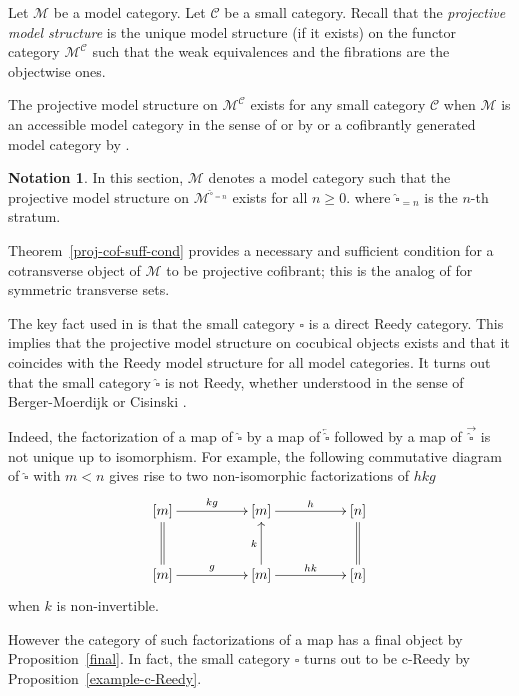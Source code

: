 \documentclass[a4paper,12pt]{amsart}
\makeatletter
\newcommand{\C}{\mathcal{C}}
\renewcommand{\vec}{\overrightarrow}
\theoremstyle{definition}
\newtheorem{nota}[thm]{Notation}
\newcommand{\fr}[1]{\ar@{->}[r]^-{#1}}
\newcommand{\fu}[1]{\ar@{->}[u]^-{#1}}
\renewcommand{\geq}{\geqslant}
\makeatother
\begin{document}
Let $\mathcal{M}$ be a model category. Let $\C$ be a small category. Recall that the \textit{projective model structure} is the unique model structure (if it exists) on the functor category $\mathcal{M}^\C$ such that the weak equivalences and the fibrations are the objectwise ones. 

The projective model structure on $\mathcal{M}^\C$ exists for any small category $\C$ when $\mathcal{M}$ is an accessible model category in the sense of \cite[Definition~5.1]{zbMATH06722019} or \cite[Definition~3.1.6]{HKRS17} by \cite[Theorem~3.4.1]{HKRS17} or a cofibrantly generated model category by \cite[Theorem~11.6.1]{ref_model2}.

\begin{nota}
	In this section, $\mathcal{M}$ denotes a model category such that the projective model structure on $\mathcal{M}^{\widehat{\square}_{=n}}$ exists for all $n\geq 0$. where $\widehat{\square}_{=n}$ is the $n$-th stratum.
\end{nota} 


Theorem~\ref{proj-cof-suff-cond} provides a necessary and sufficient condition for a cotransverse object of $\mathcal{M}$ to be projective cofibrant; this is the analog of \cite[Proposition~2.3.1]{realization} for symmetric transverse sets. 

The key fact used in \cite{realization} is that the small category $\square$ is a direct Reedy category. This implies that the projective model structure on cocubical objects exists and that it coincides with the Reedy model structure for all model categories. It turns out that the small category $\widehat{\square}$ is not Reedy, whether understood in the sense of Berger-Moerdijk \cite[Definition~1.1]{g-Reedy} or Cisinski \cite[Definition~8.1.1]{Cisinski-Book}. 

Indeed, the factorization of a map of $\widehat{\square}$ by a map of $\overleftarrow{\widehat{\square}}$ followed by a map of $\vec{\widehat{\square}}$ is not unique up to isomorphism. For example, the following commutative diagram of $\widehat{\square}$ with $m<n$ gives rise to two non-isomorphic factorizations of $hkg$
\[
\xymatrix@C=5em@R=3em
{
	[m] \fr{kg} \ar@{=}[d] & [m] \fr{h}& [n] \ar@{=}[d] \\
	[m] \fr{g} & \fu{k}[m] \fr{hk} & [n] 
}
\]
when $k$ is non-invertible. 

However the category of such factorizations of a map has a final object by Proposition~\ref{final}. In fact, the small category $\widehat{\square}$  turns out to be c-Reedy by Proposition~\ref{example-c-Reedy}. 
\end{document}
